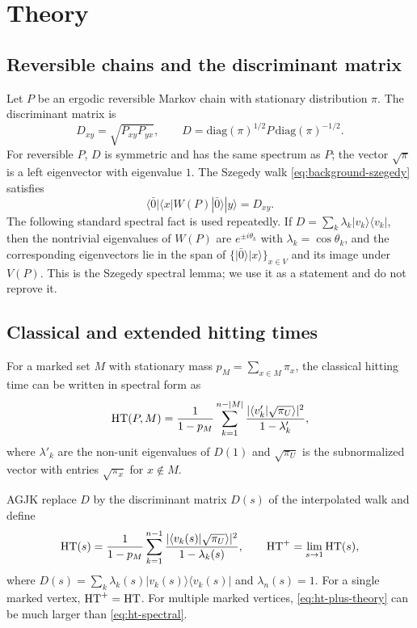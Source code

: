 \section{Theory}
\label{sec:theory}

\subsection{Reversible chains and the discriminant matrix}
\label{sec:theory-discriminant}

Let $P$ be an ergodic reversible Markov chain with stationary distribution
$\pi$. The discriminant matrix is
\begin{equation}
  D_{xy}=\sqrt{P_{xy}P_{yx}},
  \qquad
  D=\mathrm{diag}(\pi)^{1/2}P\,\mathrm{diag}(\pi)^{-1/2}.
  \label{eq:discriminant}
\end{equation}
For reversible $P$, $D$ is symmetric and has the same spectrum as $P$; the
vector $\sqrt{\pi}$ is a left eigenvector with eigenvalue $1$. The Szegedy walk
\eqref{eq:background-szegedy} satisfies
\begin{equation}
  \langle\bar0|\langle x|W(P)|\bar0\rangle|y\rangle=D_{xy}.
\end{equation}
The following standard spectral fact is used repeatedly. If
$D=\sum_k\lambda_k|v_k\rangle\langle v_k|$, then the nontrivial eigenvalues of
$W(P)$ are $e^{\pm i\theta_k}$ with $\lambda_k=\cos\theta_k$, and the
corresponding eigenvectors lie in the span of
$\{\lvert\bar0\rangle\lvert x\rangle\}_{x\in V}$ and its image under $V(P)$.
This is the Szegedy spectral lemma; we use it as a statement and do not
reprove it.

\subsection{Classical and extended hitting times}
\label{sec:theory-ht}

For a marked set $M$ with stationary mass $p_M=\sum_{x\in M}\pi_x$, the
classical hitting time can be written in spectral form as
\begin{equation}
  \mathrm{HT}(P,M)=\frac{1}{1-p_M}\sum_{k=1}^{n-|M|}
  \frac{\lvert\langle v'_k\rvert\sqrt{\pi_U}\rangle\rvert^2}{1-\lambda'_k},
  \label{eq:ht-spectral}
\end{equation}
where $\lambda'_k$ are the non-unit eigenvalues of $D(1)$ and
$\sqrt{\pi_U}$ is the subnormalized vector with entries $\sqrt{\pi_x}$ for
$x\notin M$.

AGJK replace $D$ by the discriminant matrix $D(s)$ of the interpolated walk and
define
\begin{equation}
  \mathrm{HT}(s)=\frac{1}{1-p_M}\sum_{k=1}^{n-1}
  \frac{\lvert\langle v_k(s)\rvert\sqrt{\pi_U}\rangle\rvert^2}{1-\lambda_k(s)},
  \qquad
  \mathrm{HT}^{+}=\lim_{s\to1}\mathrm{HT}(s),
  \label{eq:ht-plus-theory}
\end{equation}
where $D(s)=\sum_k\lambda_k(s)|v_k(s)\rangle\langle v_k(s)|$ and
$\lambda_n(s)=1$. For a single marked vertex, $\mathrm{HT}^{+}=\mathrm{HT}$. For multiple marked
vertices, \eqref{eq:ht-plus-theory} can be much larger than \eqref{eq:ht-spectral}.

